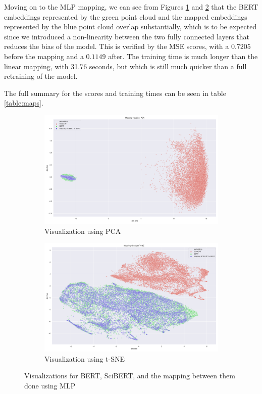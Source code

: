 \documentclass[12pt]{extreport}
\begin{document}
Moving on to the MLP mapping, we can see from Figures \ref{fig:mlp-pca} and \ref{fig:mlp-tsne} that the BERT embeddings represented by the green point cloud and the mapped embeddings represented by the blue point cloud overlap substantially, which is to be expected since we introduced a non-linearity between the two fully connected layers that reduces the bias of the model. This is verified by the MSE scores, with a $0.7205$ before the mapping and a $0.1149$ after. The training time is much longer than the linear mapping, with 31.76 seconds, but which is still much quicker than a full retraining of the model.

The full summary for the scores and training times can be seen in table \ref{table:maps}.

\begin{figure}[H]
\centering
\begin{subfigure}{.49\textwidth}
\centering
\includegraphics[width=\linewidth]{assets/addressing-change/mlp_mapping_vis_pca_SCIBERT_BERT_average.png}
\caption{Visualization using PCA}
\label{fig:mlp-pca}
\end{subfigure}
\begin{subfigure}{.49\textwidth}
\centering
\includegraphics[width=\linewidth]{assets/addressing-change/mlp_mapping_vis_tsne_SCIBERT_BERT_average.png}
\caption{Visualization using t-SNE}
\label{fig:mlp-tsne}
\end{subfigure}
\caption{Visualizations for BERT, SciBERT, and the mapping between them done using MLP}
\label{fig:mlp-viz}
\end{figure}
\end{document}
